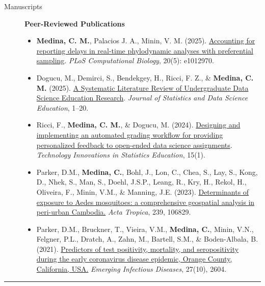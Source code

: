 \documentclass{article}
\begin{document}
	\begin{description}
		\vspace{-2mm}
		
		\item[Manuscripts] \hspace*{.1in} 
		
		\textbf{Peer-Reviewed Publications}
		\begin{itemize}
			\item \textbf{Medina, C. M.}, Palacios J. A., Minin, V. M. (2025). \href{https://doi.org/10.1371/journal.pcbi.1012970}{Accounting for reporting delays in real-time phylodynamic analyses with preferential sampling}. \textit{PLoS Computational Biology}, 20(5): e1012970.
			
			\item Dogucu, M., Demirci, S., Bendekgey, H., Ricci, F. Z., \& \textbf{Medina, C. M.} (2025). \href{https://doi.org/10.1080/26939169.2025.2486656}{A Systematic Literature Review of Undergraduate Data Science Education Research}. \textit{Journal of Statistics and Data Science Education}, 1–20.
			
			\item Ricci, F., \textbf{Medina, C. M.}, \& Dogucu, M. (2024). \href{https://doi.org/10.5070/T5.1886}{Designing and implementing an automated grading workflow for providing personalized feedback to open-ended data science assignments}. \textit{Technology Innovations in Statistics Education}, 15(1).
			
			\item Parker, D.M., \textbf{Medina, C.}, Bohl, J., Lon, C., Chea, S., Lay, S., Kong, D., Nhek, S., Man, S., Doehl, J.S.P., Leang, R., Kry, H., Rekol, H., Oliveira, F., Minin, V.M., \& Manning, J.E. (2023). \href{https://doi.org/10.1016/j.actatropica.2023.106829}{Determinants of exposure to Aedes mosquitoes: a comprehensive geospatial analysis in peri-urban Cambodia.} \textit{Acta Tropica}, 239, 106829. 
			
			\item Parker, D.M., Bruckner, T., Vieira, V.M., \textbf{Medina, C.}, Minin, V.N., Felgner, P.L., Dratch, A., Zahn, M., Bartell, S.M., \& Boden-Albala, B. (2021). \href{https://doi.org/10.3201/eid2710.210103}{Predictors of test positivity, mortality, and seropositivity during the early coronavirus disease epidemic, Orange County, California, USA.} \textit{Emerging Infectious Diseases}, 27(10), 2604.
		\end{itemize}	
		
	\end{description}
	\vspace{-2mm}
	\rule{\linewidth}{1pt}
	
\end{document}
